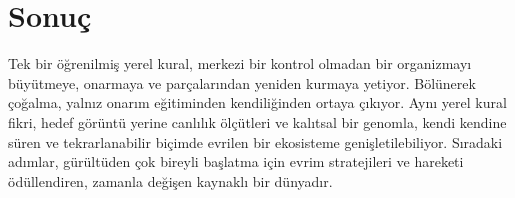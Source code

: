 \documentclass[conference]{IEEEtran}
\begin{document}
\section{Sonuç}
Tek bir öğrenilmiş yerel kural, merkezi bir kontrol olmadan bir organizmayı büyütmeye, onarmaya ve parçalarından yeniden kurmaya yetiyor. Bölünerek çoğalma, yalnız onarım eğitiminden kendiliğinden ortaya çıkıyor. Aynı yerel kural fikri, hedef görüntü yerine canlılık ölçütleri ve kalıtsal bir genomla, kendi kendine süren ve tekrarlanabilir biçimde evrilen bir ekosisteme genişletilebiliyor. Sıradaki adımlar, gürültüden çok bireyli başlatma için evrim stratejileri ve hareketi ödüllendiren, zamanla değişen kaynaklı bir dünyadır.



\end{document}
